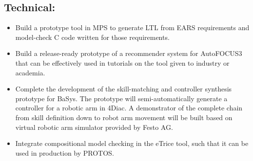 \documentclass{scrartcl}
\begin{document}
\begin{appendices}
\subsection{Technical:}

\begin{itemize}
  \item Build a prototype tool in MPS to generate LTL from EARS requirements and
  model-check C code written for those requirements. 
  \item Build a release-ready prototype of a recommender system for AutoFOCUS3
  that can be effectively used in tutorials on the tool given to industry or
  academia.
  \item Complete the development of the skill-matching and controller
  synthesis prototype for BaSys. The prototype will semi-automatically generate
  a controller for a robotic arm in 4Diac. A demonstrator of the complete chain
  from skill definition down to robot arm movement will be built based on
  virtual robotic arm simulator provided by Festo AG. 
  \item Integrate compositional model checking in the eTrice tool, such that it
  can be used in production by PROTOS.
\end{itemize}

\end{appendices}



\end{document}
